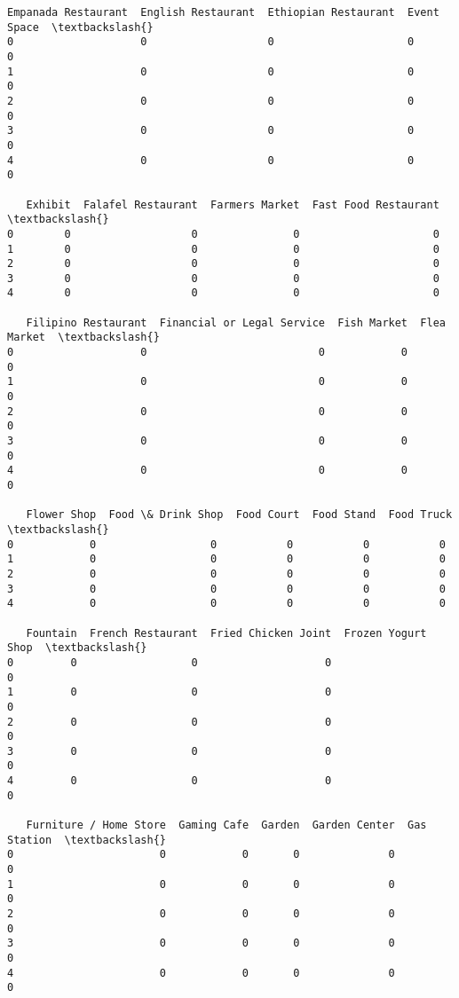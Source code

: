 \documentclass[11pt]{article}
\begin{document}
\begin{tcolorbox}[breakable, size=fbox, boxrule=.5pt, pad at break*=1mm, opacityfill=0]
\begin{Verbatim}[commandchars=\\\{\}]
   Empanada Restaurant  English Restaurant  Ethiopian Restaurant  Event Space  \textbackslash{}
0                    0                   0                     0            0
1                    0                   0                     0            0
2                    0                   0                     0            0
3                    0                   0                     0            0
4                    0                   0                     0            0

   Exhibit  Falafel Restaurant  Farmers Market  Fast Food Restaurant  \textbackslash{}
0        0                   0               0                     0
1        0                   0               0                     0
2        0                   0               0                     0
3        0                   0               0                     0
4        0                   0               0                     0

   Filipino Restaurant  Financial or Legal Service  Fish Market  Flea Market  \textbackslash{}
0                    0                           0            0            0
1                    0                           0            0            0
2                    0                           0            0            0
3                    0                           0            0            0
4                    0                           0            0            0

   Flower Shop  Food \& Drink Shop  Food Court  Food Stand  Food Truck  \textbackslash{}
0            0                  0           0           0           0
1            0                  0           0           0           0
2            0                  0           0           0           0
3            0                  0           0           0           0
4            0                  0           0           0           0

   Fountain  French Restaurant  Fried Chicken Joint  Frozen Yogurt Shop  \textbackslash{}
0         0                  0                    0                   0
1         0                  0                    0                   0
2         0                  0                    0                   0
3         0                  0                    0                   0
4         0                  0                    0                   0

   Furniture / Home Store  Gaming Cafe  Garden  Garden Center  Gas Station  \textbackslash{}
0                       0            0       0              0            0
1                       0            0       0              0            0
2                       0            0       0              0            0
3                       0            0       0              0            0
4                       0            0       0              0            0


\end{Verbatim}
\end{tcolorbox}
\end{document}

